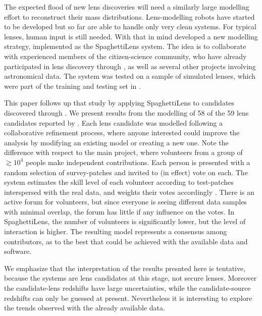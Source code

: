 The expected flood of new lens discoveries will need a similarly large
modelling effort to reconstruct their mass distributions.
Lens-modelling robots have started to be developed
\citep{2017arXiv170807377N,2017arXiv170808842H} but so far are able to
handle only very clean systems.  For typical lenses, human input is
still needed.  With that in mind \cite{2015MNRAS.447.2170K} developed
a new modelling strategy, implemented as the SpaghettiLens system.
The idea is to collaborate with experienced members of the
citizen-science community, who have already participated in lens
discovery through \SW, as well as several other projects involving
astronomical data.  The system was tested on a sample of simulated
lenses, which were part of the training and testing set in \SW.

This paper follows up that study by applying SpaghettiLens to
candidates discovered through \SW.  We present results from
the modelling of 58 of the 59 lens candidates reported by
\cite{2016MNRAS.455.1191M}.  Each lens candidate was modelled
following a collaborative refinement process, where anyone interested
could improve the analysis by modifying an existing model or creating
a new one. Note the difference with respect to the main \SW 
project, where volunteers from a group of $\gtrsim10^4$ people make
independent contributions.  Each person is presented with a random
selection of survey-patches and invited to (in effect) vote on each.
The system estimates the skill level of each volunteer according to
test-patches interspersed with the real data, and weights their votes
accordingly \citep{2016MNRAS.455.1171M}.  There is an active forum for
volunteers, but since everyone is seeing different data samples with
minimal overlap, the forum has little if any influence on the votes.
In SpaghettiLens, the number of volunteers is significantly lower, but
the level of interaction is higher.  The resulting model represents a
consensus among contributors, as to the best that could be achieved
with the available data and software.

We emphasize that the interpretation of the results presnted here is
tentative, because the systems are lens candidates at this stage, not
secure lenses.  Moreover the candidate-lens redshifts have large
uncertainties, while the candidate-source redshifts can only be
guessed at present.  Nevertheless it is interesting to explore the
trends observed with the already available data.

